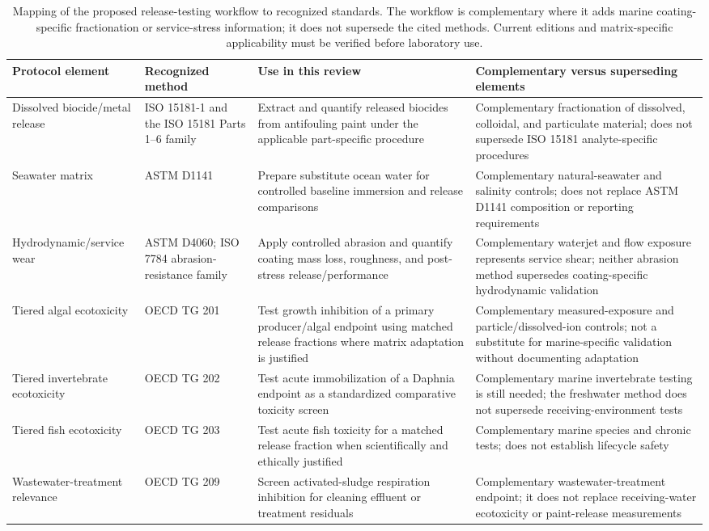 \begin{table}[t]
\centering
\caption{Mapping of the proposed release-testing workflow to recognized standards. The workflow is complementary where it adds marine coating-specific fractionation or service-stress information; it does not supersede the cited methods. Current editions and matrix-specific applicability must be verified before laboratory use.}
\label{tab:standards_mapping}
\small
\begin{tabularx}{\textwidth}{l l X X}
\toprule
Protocol element & Recognized method & Use in this review & Complementary versus superseding elements \\
\midrule
Dissolved biocide/metal release & ISO 15181-1 and the ISO 15181 Parts 1--6 family & Extract and quantify released biocides from antifouling paint under the applicable part-specific procedure & Complementary fractionation of dissolved, colloidal, and particulate material; does not supersede ISO 15181 analyte-specific procedures \\
Seawater matrix & ASTM D1141 & Prepare substitute ocean water for controlled baseline immersion and release comparisons & Complementary natural-seawater and salinity controls; does not replace ASTM D1141 composition or reporting requirements \\
Hydrodynamic/service wear & ASTM D4060; ISO 7784 abrasion-resistance family & Apply controlled abrasion and quantify coating mass loss, roughness, and post-stress release/performance & Complementary waterjet and flow exposure represents service shear; neither abrasion method supersedes coating-specific hydrodynamic validation \\
Tiered algal ecotoxicity & OECD TG 201 & Test growth inhibition of a primary producer/algal endpoint using matched release fractions where matrix adaptation is justified & Complementary measured-exposure and particle/dissolved-ion controls; not a substitute for marine-specific validation without documenting adaptation \\
Tiered invertebrate ecotoxicity & OECD TG 202 & Test acute immobilization of a Daphnia endpoint as a standardized comparative toxicity screen & Complementary marine invertebrate testing is still needed; the freshwater method does not supersede receiving-environment tests \\
Tiered fish ecotoxicity & OECD TG 203 & Test acute fish toxicity for a matched release fraction when scientifically and ethically justified & Complementary marine species and chronic tests; does not establish lifecycle safety \\
Wastewater-treatment relevance & OECD TG 209 & Screen activated-sludge respiration inhibition for cleaning effluent or treatment residuals & Complementary wastewater-treatment endpoint; it does not replace receiving-water ecotoxicity or paint-release measurements \\
\bottomrule
\end{tabularx}
\end{table}
